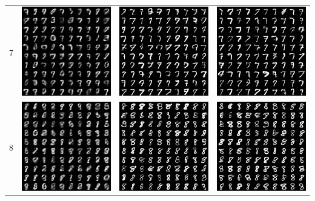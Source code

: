 \documentclass[12pt,a4paper]{article}
\begin{document}
\begin{table}
\begin{tabular}{cccc}
			7 & \includegraphics[width=4cm]{Figures/Epoch1_Label7} & \includegraphics[width=4cm]{Figures/Epoch50_Label7} & \includegraphics[width=4cm]{Figures/Epoch100_Label7}  \\
			8 & \includegraphics[width=4cm]{Figures/Epoch1_Label8} & \includegraphics[width=4cm]{Figures/Epoch50_Label8} & \includegraphics[width=4cm]{Figures/Epoch100_Label8}  \\

\end{tabular}
\end{table}
\end{document}
